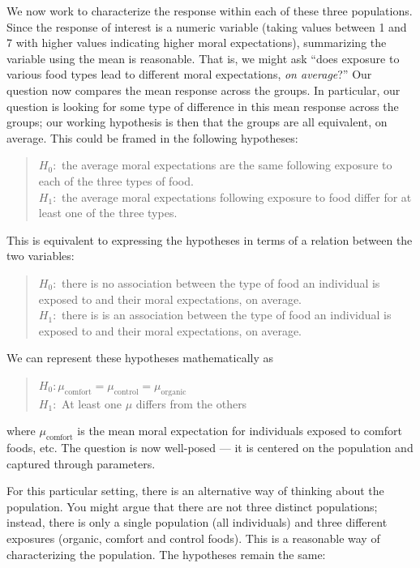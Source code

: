 \documentclass[
]{book}
\theoremstyle{plain}
\theoremstyle{mydefn}
\theoremstyle{myexmpl}
\theoremstyle{remark}
\begin{document}
We now work to characterize the response within each of these three populations. Since the response of interest is a numeric variable (taking values between 1 and 7 with higher values indicating higher moral expectations), summarizing the variable using the mean is reasonable. That is, we might ask ``does exposure to various food types lead to different moral expectations, \emph{on average}?'' Our question now compares the mean response across the groups. In particular, our question is looking for some type of difference in this mean response across the groups; our working hypothesis is then that the groups are all equivalent, on average. This could be framed in the following hypotheses:

\begin{quote}
\(H_0:\) the average moral expectations are the same following exposure to each of the three types of food.\\
\(H_1:\) the average moral expectations following exposure to food differ for at least one of the three types.
\end{quote}

This is equivalent to expressing the hypotheses in terms of a relation between the two variables:

\begin{quote}
\(H_0:\) there is no association between the type of food an individual is exposed to and their moral expectations, on average.\\
\(H_1:\) there is is an association between the type of food an individual is exposed to and their moral expectations, on average.
\end{quote}

We can represent these hypotheses mathematically as

\begin{quote}
\(H_0: \mu_{\text{comfort}} = \mu_{\text{control}} = \mu_{\text{organic}}\)\\
\(H_1:\) At least one \(\mu\) differs from the others
\end{quote}

where \(\mu_{\text{comfort}}\) is the mean moral expectation for individuals exposed to comfort foods, etc. The question is now well-posed --- it is centered on the population and captured through parameters.

For this particular setting, there is an alternative way of thinking about the population. You might argue that there are not three distinct populations; instead, there is only a single population (all individuals) and three different exposures (organic, comfort and control foods). This is a reasonable way of characterizing the population. The hypotheses remain the same:
\end{document}
